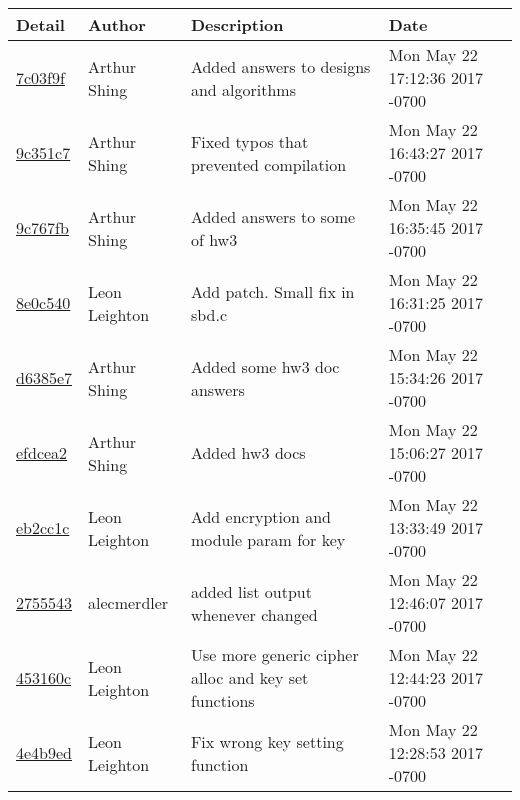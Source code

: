 \begin{tabular}{l l l l}\textbf{Detail} & \textbf{Author} & \textbf{Description} & \textbf{Date}\\\hline
\href{https://github.com/alecmerdler/cs-444-group-119/commit/7c03f9fd9e1c762761414991f8f98c5e8ab2f1d2}{7c03f9f} & Arthur Shing & Added answers to designs and algorithms & Mon May 22 17:12:36 2017 -0700\\\hline
\href{https://github.com/alecmerdler/cs-444-group-119/commit/9c351c7025fec2b54b7ac732c82d8b4ccee463aa}{9c351c7} & Arthur Shing & Fixed typos that prevented compilation & Mon May 22 16:43:27 2017 -0700\\\hline
\href{https://github.com/alecmerdler/cs-444-group-119/commit/9c767fb23e4222d93544b8cfd3d80e13e2a0f5e6}{9c767fb} & Arthur Shing & Added answers to some of hw3 & Mon May 22 16:35:45 2017 -0700\\\hline
\href{https://github.com/alecmerdler/cs-444-group-119/commit/8e0c5406cc7e8aad17ca5f3f23579b7f8076a5d3}{8e0c540} & Leon Leighton & Add patch. Small fix in sbd.c & Mon May 22 16:31:25 2017 -0700\\\hline
\href{https://github.com/alecmerdler/cs-444-group-119/commit/d6385e74b4d9a135c8871d73aa8e8610ca35a50a}{d6385e7} & Arthur Shing & Added some hw3 doc answers & Mon May 22 15:34:26 2017 -0700\\\hline
\href{https://github.com/alecmerdler/cs-444-group-119/commit/efdcea237666de7dced78cf77315d4a591dfed53}{efdcea2} & Arthur Shing & Added hw3 docs & Mon May 22 15:06:27 2017 -0700\\\hline
\href{https://github.com/alecmerdler/cs-444-group-119/commit/eb2cc1c3d94c29dc80bbfee074ba5ca9f5eb5b0b}{eb2cc1c} & Leon Leighton & Add encryption and module param for key & Mon May 22 13:33:49 2017 -0700\\\hline
\href{https://github.com/alecmerdler/cs-444-group-119/commit/275554391545952a3b61ff2ea9d9374aa29f7ea6}{2755543} & alecmerdler & added list output whenever changed & Mon May 22 12:46:07 2017 -0700\\\hline
\href{https://github.com/alecmerdler/cs-444-group-119/commit/453160c46fa536405ce4924b9f8ddaeba5003eee}{453160c} & Leon Leighton & Use more generic cipher alloc and key set functions & Mon May 22 12:44:23 2017 -0700\\\hline
\href{https://github.com/alecmerdler/cs-444-group-119/commit/4e4b9edfb6e616abc68cf7963f7e457a6e639877}{4e4b9ed} & Leon Leighton & Fix wrong key setting function & Mon May 22 12:28:53 2017 -0700\\\hline

\end{tabular}
